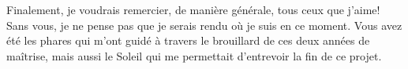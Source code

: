 Finalement, je voudrais remercier, de manière générale, tous ceux que j'aime!
Sans vous, je ne pense pas que je serais rendu où je suis en ce moment.
Vous avez été les phares qui m'ont guidé à travers le brouillard de ces deux années de maîtrise, mais aussi le Soleil qui me permettait d'entrevoir la fin de ce projet.







